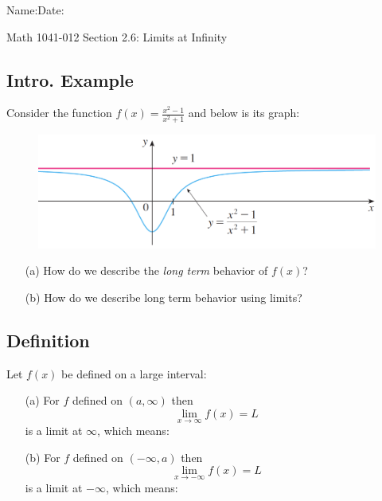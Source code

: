 \documentclass[10pt]{book}
\theoremstyle{definition}
\begin{document}
\begin{flushleft}
Name:\underline{\hspace{13cm}}Date:\underline{\hspace{2cm}}
\end{flushleft}
\begin{center}
{\Large Math 1041-012 \hspace{0.5cm} Section 2.6: Limits at Infinity}
\end{center}
\subsection*{Intro. Example} Consider the function $\displaystyle f(x)=\frac{x^2-1}{x^2+1}$ and below is its graph:
\begin{figure}[h!]
\centering
    \includegraphics[scale=0.75]{fig1.png}
\end{figure}
\begin{itemize}
    \item[(a)] How do we describe the \textit{long term} behavior of $f(x)$?\vspace{1cm}
    \item[(b)] How do we describe long term behavior using limits?
\end{itemize}
\vspace{1cm}
\begin{tcolorbox}
\subsection*{Definition} Let $f(x)$ be defined on a large interval:
\begin{itemize}
    \item[(a)] For $f$ defined on $(a,\infty)$ then
    \[
    \lim_{x\rightarrow \infty}f(x)=L
    \]
    is a limit at $\infty$, which means:
    \vspace{0.5cm}
    \item[(b)] For $f$ defined on $(-\infty,a)$ then
    \[
    \lim_{x\rightarrow -\infty}f(x)=L
    \]
    is a limit at $-\infty$, which means:\vspace{0.5cm}
\end{itemize}
\end{tcolorbox}
\end{document}
